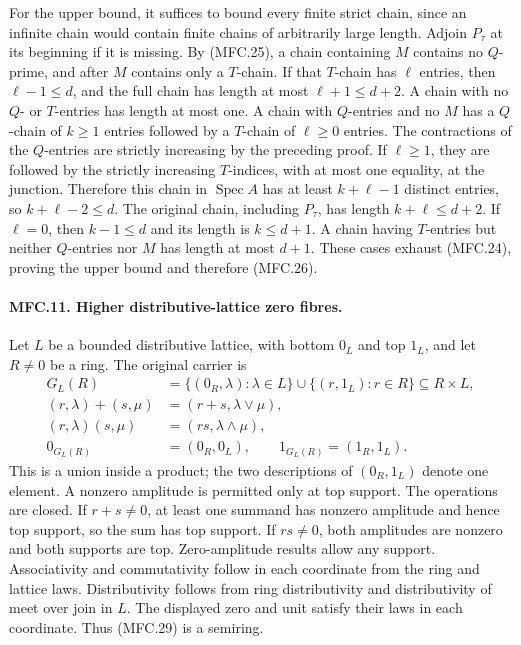 For the upper bound, it suffices to bound every finite strict
chain, since an infinite chain would contain finite chains
of arbitrarily large length. Adjoin \(P_\tau\) at its beginning
if it is missing. By (MFC.25), a chain containing \(M\) contains
no \(Q\)-prime, and after \(M\) contains only a \(T\)-chain.
If that \(T\)-chain has \(\ell\) entries, then
\(\ell-1\le d\), and the full chain has length at most
\(\ell+1\le d+2\). A chain with no \(Q\)- or \(T\)-entries
has length at most one.
A chain with \(Q\)-entries and no \(M\) has a \(Q\)-chain
of \(k\ge1\) entries followed by a \(T\)-chain of
\(\ell\ge0\) entries. The contractions of the \(Q\)-entries
are strictly increasing by the preceding proof. If
\(\ell\ge1\), they are followed by the strictly increasing
\(T\)-indices, with at most one equality, at the junction.
Therefore this chain in \(\operatorname{Spec}A\) has at least
\(k+\ell-1\) distinct entries, so \(k+\ell-2\le d\).
The original chain, including \(P_\tau\), has length
\(k+\ell\le d+2\). If \(\ell=0\), then \(k-1\le d\) and
its length is \(k\le d+1\). A chain having \(T\)-entries
but neither \(Q\)-entries nor \(M\) has length at most \(d+1\).
These cases exhaust (MFC.24), proving the upper bound and
therefore (MFC.26).

\paragraph{MFC.11. Higher distributive-lattice zero fibres.}
Let \(L\) be a bounded distributive lattice, with bottom \(0_L\)
and top \(1_L\), and let \(R\ne0\) be a ring. The original carrier is
\[
 \begin{split}
 G_L(R)&=\{(0_R,\lambda):\lambda\in L\}
                \cup\{(r,1_L):r\in R\}\subseteq R\times L,\\
 (r,\lambda)+(s,\mu)&=(r+s,\lambda\vee\mu),\\
 (r,\lambda)(s,\mu)&=(rs,\lambda\wedge\mu),\\
 0_{G_L(R)}&=(0_R,0_L),\qquad1_{G_L(R)}=(1_R,1_L).
 \end{split}                                             \tag{MFC.29}
\]
This is a union inside a product; the two descriptions of
\((0_R,1_L)\) denote one element. A nonzero amplitude is
permitted only at top support.
The operations are closed. If \(r+s\ne0\), at least one
summand has nonzero amplitude and hence top support, so the
sum has top support. If \(rs\ne0\), both amplitudes are nonzero
and both supports are top. Zero-amplitude results allow any
support. Associativity and commutativity follow in each
coordinate from the ring and lattice laws. Distributivity
follows from ring distributivity and distributivity of meet
over join in \(L\). The displayed zero and unit satisfy their
laws in each coordinate. Thus (MFC.29) is a semiring.

